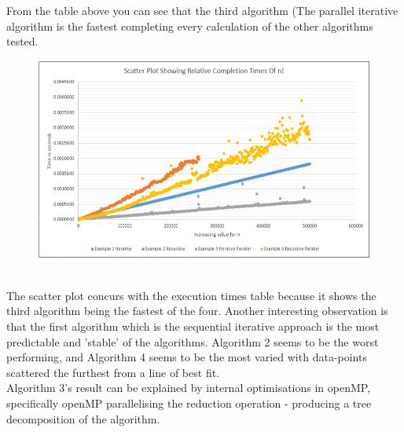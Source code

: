\documentclass[11pt]{article}
\begin{document}
\begin{page}
\noindent From the table above you can see that the third algorithm (The parallel iterative algorithm is the fastest completing every calculation of the other algorithms tested.

\begin{figure}[ht]
\centering
     \includegraphics[scale=0.50]{scatter_plot}
\end{figure}\\

\noindent The scatter plot concurs with the execution times table because it shows the third algorithm being the fastest of the four. Another interesting observation is that the first algorithm which is the sequential iterative approach is the most predictable and 'stable' of the algorithms. Algorithm 2 seems to be the worst performing, and Algorithm 4 seems to be the most varied with data-points scattered the furthest from a line of best fit.\\

\noindent Algorithm 3's result can be explained by internal optimisations in openMP, specifically openMP parallelising the reduction operation - producing a tree decomposition of the algorithm.

\end{page}
\end{document}
